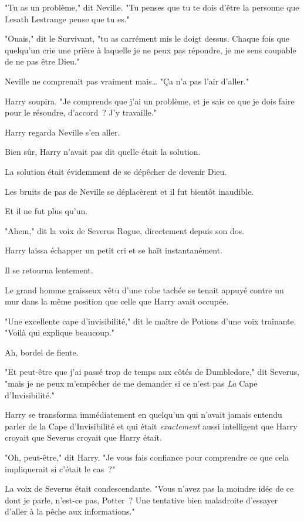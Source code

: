 "Tu as un problème," dit Neville. "Tu penses que tu te dois d'être la personne que Lesath Lestrange pense que tu es."

"Ouais," dit le Survivant, "tu as carrément mis le doigt dessus. Chaque fois que quelqu'un crie une prière à laquelle je ne peux pas répondre, je me sens coupable de ne pas être Dieu."

Neville ne comprenait pas vraiment mais… "Ça n'a pas l'air d'aller."

Harry soupira. "Je comprends que j'ai un problème, et je sais ce que je dois faire pour le résoudre, d'accord~? J'y travaille."

\later

Harry regarda Neville s'en aller.

Bien sûr, Harry n'avait pas dit quelle était la solution.

La solution était évidemment de se dépêcher de devenir Dieu.

Les bruits de pas de Neville se déplacèrent et il fut bientôt inaudible.

Et il ne fut plus qu'un.

"Ahem," dit la voix de Severus Rogue, directement depuis son dos.

Harry laissa échapper un petit cri et se haït instantanément.

Il se retourna lentement.

Le grand homme graisseux vêtu d’une robe tachée se tenait appuyé contre un mur dans la même position que celle que Harry avait occupée.

"Une excellente cape d'invisibilité," dit le maître de Potions d'une voix traînante. "Voilà qui explique beaucoup."

Ah, bordel de fiente.

"Et peut-être que j'ai passé trop de temps aux côtés de Dumbledore," dit Severus, "mais je ne peux m'empêcher de me demander si ce n'est pas \emph{La} Cape d'Invisibilité."

Harry se transforma immédiatement en quelqu'un qui n'avait jamais entendu parler de la Cape d'Invisibilité et qui était \emph{exactement} aussi intelligent que Harry croyait que Severus croyait que Harry était.

"Oh, peut-être," dit Harry. "Je vous fais confiance pour comprendre ce que cela impliquerait si c'était le cas~?"

La voix de Severus était condescendante. "Vous n'avez pas la moindre idée de ce dont je parle, n'est-ce pas, Potter~? Une tentative bien maladroite d'essayer d'aller à la pêche aux informations."

